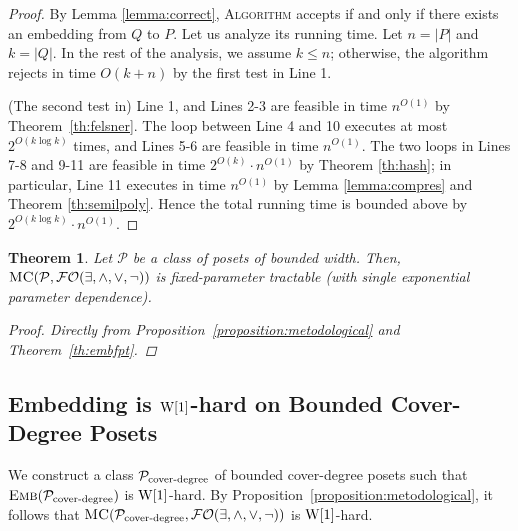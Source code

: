 \documentclass[usletter]{article}
\newcommand{\longversion}[1]{#1}
\newtheorem{theorem}{Theorem}
\begin{document}
\newcommand{\pfembfpt}[0]{
\begin{proof}
By Lemma \ref{lemma:correct}, \textsc{Algorithm} accepts if and only if there exists an embedding from $Q$ to $P$.  
Let us analyze its running time.  Let $n=|P|$ and $k=|Q|$.  In the rest of the analysis, 
we assume $k \leq n$; otherwise, the algorithm rejects in time $O(k+n)$ by the first test in Line 1.  

(The second test in) Line 1, and Lines 2-3 are feasible in time $n^{O(1)}$ by Theorem~\ref{th:felsner}. 
The loop between Line 4 and 10 executes at most $2^{O(k\log k)}$ times, 
and Lines 5-6 are feasible in time $n^{O(1)}$. 
The two loops in Lines 7-8 and 9-11 are feasible in time $2^{O(k)}\cdot n^{O(1)}$ by Theorem \ref{th:hash}; 
in particular, Line 11 executes in time $n^{O(1)}$ by 
Lemma \ref{lemma:compres} and Theorem \ref{th:semilpoly}. 
Hence the total running time is bounded above by $2^{O(k\log k)}\cdot n^{O(1)}$.
\end{proof}}

\longversion{\pfembfpt}



\begin{theorem}
\label{thm:EFOFPT}
Let $\mathcal{P}$ be a class of
posets of bounded width.  Then, 
$\textsc{MC}(\mathcal{P},\mathcal{FO}(\exists,\wedge,\vee,\neg))$ is fixed-parameter tractable 
(with single exponential parameter dependence).
\begin{proof}
Directly from Proposition~\ref{proposition:metodological}  
and Theorem~\ref{th:embfpt}.
\end{proof}
\end{theorem}

\subsection{Embedding is $\textup{W}[1]$-hard on Bounded Cover-Degree Posets}\label{sect:bdcover}

We construct a class $\mathcal{P}_{\textup{cover\textup{-}degree}}$ of bounded cover-degree posets 
such that $\textsc{Emb}(\mathcal{P}_{\textup{cover\textup{-}degree}})$ is $\textup{W}[1]$-hard.  
By Proposition~\ref{proposition:metodological}, it follows 
that $\textsc{MC}(\mathcal{P}_{\textup{cover\textup{-}degree}},\mathcal{FO}(\exists,\wedge,\vee,\neg))$ 
is $\textup{W}[1]$-hard.
\end{document}

